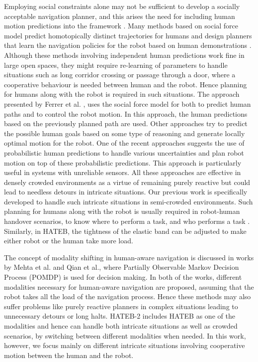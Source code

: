 Employing social constraints alone may not be sufficient to develop a socially acceptable navigation planner, and this arises the need for including human motion predictions into the framework \cite{kuderer_rss_2012}. Many methods based on social force model \cite{helbing1995social} predict homotopically distinct trajectories for humans and design planners that learn the navigation policies for the robot based on human demonstrations \cite{kuderer_rss_2012}. Although these methods involving independent human predictions work fine in large open spaces, they might require re-learning of parameters to handle situations such as long corridor crossing or passage through a door, where a cooperative behaviour is needed between human and the robot. Hence planning for humans along with the robot is required in such situations. The approach presented by Ferrer et al. \cite{ferrer2015multi}, uses the social force model for both to predict human paths and to control the robot motion. In this approach, the human predictions based on the previously planned path are used. Other approaches \cite{bordallo_iros_2015, nagariya_cdc_2015} try to predict the possible human goals based on some type of reasoning and generate locally optimal motion for the robot. One of the recent approaches \cite{fisac2018probabilistically} suggests the use of probabilistic human predictions to handle various uncertainties and plan robot motion on top of these probabilistic predictions. This approach is particularly useful in systems with unreliable sensors. All these approaches are effective in densely crowded environments as a virtue of remaining purely reactive but could lead to needless detours in intricate situations. Our previous work \cite{khambhaita2017viewing} is specifically developed to handle such intricate situations in semi-crowded environments. Such planning for humans along with the robot is usually required in robot-human handover scenarios, to know where to perform a task, and who performs a task \cite{mainprice_ro-man_2012,waldhart_iros_2015}. Similarly, in HATEB, the tightness of the elastic band can be adjusted to make either robot or the human take more load. 

The concept of modality shifting in human-aware navigation is discussed in works by Mehta et al. \cite{mehta2016autonomous} and Qian et al.\cite{qian2013decision}, where Partially Observable Markov Decision Process (POMDP) is used for decision making. In both of the works, different modalities necessary for human-aware navigation are proposed, assuming that the robot takes all the load of the navigation process. Hence these methods may also suffer problems like purely reactive planners in complex situations leading to unnecessary detours or long halts. HATEB-2 includes HATEB as one of the modalities and hence can handle both intricate situations as well as crowded scenarios, by switching between different modalities when needed. In this work, however, we focus mainly on different intricate situations involving cooperative motion between the human and the robot. 

